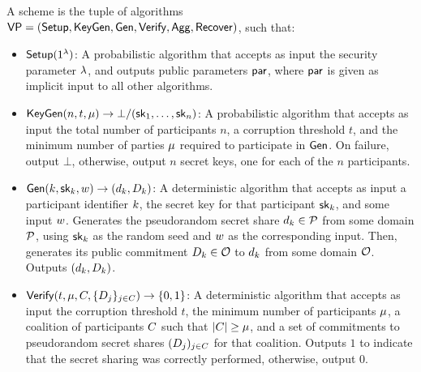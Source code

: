 \begin{definition}
A  scheme is the tuple of algorithms
$\mathsf{VP} = (\mathsf{Setup}, \mathsf{KeyGen}, \mathsf{Gen}, \mathsf{Verify}, \mathsf{Agg}, \mathsf{Recover})$,
such that:

\begin{itemize}
  \item $\mathsf{Setup}(1^{\lambda})$:
A probabilistic algorithm that accepts as input the security parameter $\lambda$,
and outputs public parameters $\mathsf{par}$,
where $\mathsf{par}$ is given as implicit input to all other algorithms.
  \item $\mathsf{KeyGen}(n, t,\mu) \rightarrow \bot/(\mathsf{sk}_1, \ldots, \mathsf{sk}_n)$:
    A probabilistic algorithm that accepts as input the total number of participants $n$,
    a corruption threshold $t$,
    and the minimum number of parties $\mu$ required to participate in $\mathsf{Gen}$.
    On failure,
    output $\bot$,
    otherwise,
    output $n$ secret keys, one for each of the $n$ participants.
  \item $\mathsf{Gen}(k, \mathsf{sk}_k, w) \rightarrow
    (d_k, D_k)$:
    A deterministic algorithm that accepts as input a participant identifier $k$,
the secret key for that participant $\mathsf{sk}_k$,
and some input $w$.
Generates the pseudorandom secret share $d_k \in \mathcal{P}$ from
some domain $\mathcal{P}$,
using $\mathsf{sk}_k$ as the random seed and $w$ as the corresponding input.
Then, generates its public commitment $D_k \in \mathcal{O}$
to $d_k$ from some domain $\mathcal{O}$.
Outputs $(d_k, D_k)$.
  \item $\mathsf{Verify}(t, \mu, C, \{ D_j \}_{j \in C}) \rightarrow \{ 0, 1\}$:
A deterministic algorithm that accepts as input the corruption threshold $t$,
the minimum number of participants $\mu$,
a coalition of participants $C$ such that $\lvert C \rvert \geq \mu$,
and a set of commitments to pseudorandom secret shares $( D_j )_{j \in C}$  for that coalition.
Outputs $1$ to indicate that the secret sharing was correctly performed,
otherwise, output $0$.

\end{itemize}
\end{definition}
